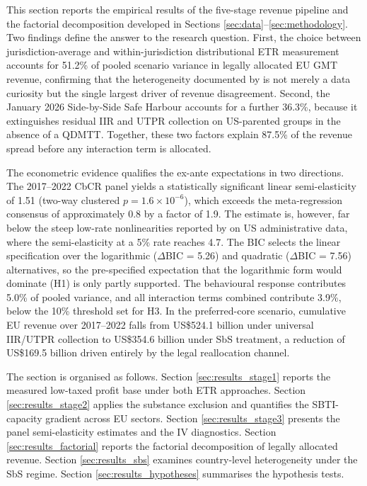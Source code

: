 \documentclass[11pt,a4paper]{article}
\begin{document}
This section reports the empirical results of the five-stage revenue pipeline and the factorial decomposition developed in Sections \ref{sec:data}--\ref{sec:methodology}. Two findings define the answer to the research question. First, the choice between jurisdiction-average and within-jurisdiction distributional ETR measurement accounts for 51.2\% of pooled scenario variance in legally allocated EU GMT revenue, confirming that the heterogeneity documented by \citet{hugger2026} is not merely a data curiosity but the single largest driver of revenue disagreement. Second, the January 2026 Side-by-Side Safe Harbour accounts for a further 36.3\%, because it extinguishes residual IIR and UTPR collection on US-parented groups in the absence of a QDMTT. Together, these two factors explain 87.5\% of the revenue spread before any interaction term is allocated.

The econometric evidence qualifies the ex-ante expectations in two directions. The 2017--2022 CbCR panel yields a statistically significant linear semi-elasticity of 1.51 (two-way clustered $p = 1.6 \times 10^{-6}$), which exceeds the meta-regression consensus of approximately 0.8 \citep{heckemeyer2017} by a factor of 1.9. The estimate is, however, far below the steep low-rate nonlinearities reported by \citet{dowd2017} on US administrative data, where the semi-elasticity at a 5\% rate reaches 4.7. The BIC selects the linear specification over the logarithmic ($\Delta$BIC = 5.26) and quadratic ($\Delta$BIC = 7.56) alternatives, so the pre-specified expectation that the logarithmic form would dominate (H1) is only partly supported. The behavioural response contributes 5.0\% of pooled variance, and all interaction terms combined contribute 3.9\%, below the 10\% threshold set for H3. In the preferred-core scenario, cumulative EU revenue over 2017--2022 falls from US\$524.1 billion under universal IIR/UTPR collection to US\$354.6 billion under SbS treatment, a reduction of US\$169.5 billion driven entirely by the legal reallocation channel.

The section is organised as follows. Section \ref{sec:results_stage1} reports the measured low-taxed profit base under both ETR approaches. Section \ref{sec:results_stage2} applies the substance exclusion and quantifies the SBTI-capacity gradient across EU sectors. Section \ref{sec:results_stage3} presents the panel semi-elasticity estimates and the IV diagnostics. Section \ref{sec:results_factorial} reports the factorial decomposition of legally allocated revenue. Section \ref{sec:results_sbs} examines country-level heterogeneity under the SbS regime. Section \ref{sec:results_hypotheses} summarises the hypothesis tests.
\end{document}
